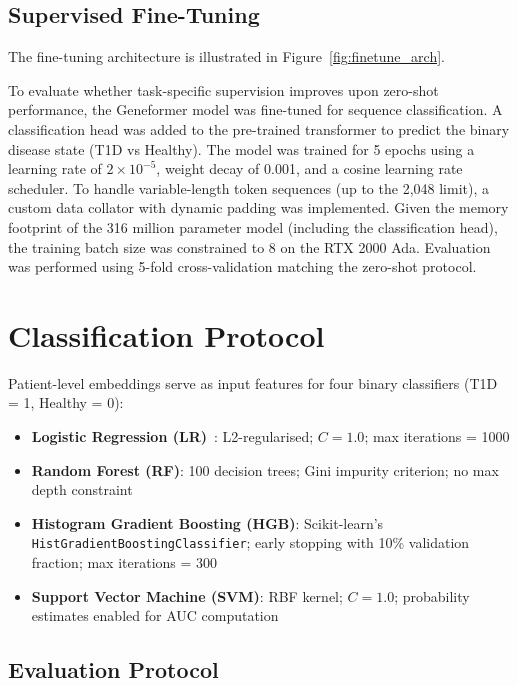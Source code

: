 \subsection{Supervised Fine-Tuning}

The fine-tuning architecture is illustrated in Figure~\ref{fig:finetune_arch}.


To evaluate whether task-specific supervision improves upon zero-shot performance, the Geneformer model was fine-tuned for sequence classification. A classification head was added to the pre-trained transformer to predict the binary disease state (T1D vs Healthy). The model was trained for 5 epochs using a learning rate of $2\times 10^{-5}$, weight decay of 0.001, and a cosine learning rate scheduler. To handle variable-length token sequences (up to the 2,048 limit), a custom data collator with dynamic padding was implemented. Given the memory footprint of the 316 million parameter model (including the classification head), the training batch size was constrained to 8 on the RTX 2000 Ada. Evaluation was performed using 5-fold cross-validation matching the zero-shot protocol.

\section{Classification Protocol}

Patient-level embeddings serve as input features for four binary classifiers (T1D = 1, Healthy = 0):

\begin{itemize}
    \item \textbf{Logistic Regression (LR)}~\cite{dominguez2022cross}: L2-regularised; $C=1.0$; max iterations = 1000
    \item \textbf{Random Forest (RF)}: 100 decision trees; Gini impurity criterion; no max depth constraint
    \item \textbf{Histogram Gradient Boosting (HGB)}: Scikit-learn's \texttt{HistGradientBoostingClassifier}; early stopping with 10\% validation fraction; max iterations = 300
    \item \textbf{Support Vector Machine (SVM)}: RBF kernel; $C=1.0$; probability estimates enabled for AUC computation
\end{itemize}

\subsection{Evaluation Protocol}

